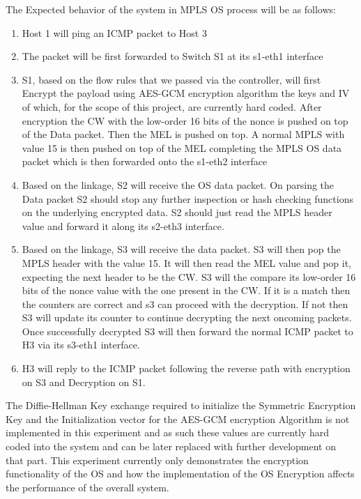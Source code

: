 The Expected behavior of the system in MPLS OS process will be as follows:
\begin{enumerate}
\item Host 1 will ping an ICMP packet to Host 3
\item The packet will be first forwarded to Switch S1 at its s1-eth1 interface
\item S1, based on the flow rules that we passed via the controller, will first Encrypt the payload using AES-GCM encryption algorithm the keys and IV of which, for the scope of this project, are currently hard coded. After encryption the CW with the low-order 16 bits of the nonce is pushed on top of the Data packet. Then the MEL is pushed on top. A normal MPLS with value 15 is then pushed on top of the MEL completing the MPLS OS data packet which is then forwarded onto the s1-eth2 interface
\item Based on the linkage, S2 will receive the OS data packet. On parsing the Data packet S2 should stop any further inspection or hash checking functions on the underlying encrypted data. S2 should just read the MPLS header value and forward it along its s2-eth3 interface.
\item Based on the linkage, S3 will receive the data packet. S3 will then pop the MPLS header with the value 15. It will then read the MEL value and pop it, expecting the next header to be the CW. S3 will the compare its low-order 16 bits of the nonce value with the one present in the CW. If it is a match then the counters are correct and s3 can proceed with the decryption. If not then S3 will update its counter to continue decrypting the next oncoming packets. Once successfully decrypted S3 will then forward the normal ICMP packet to H3 via its s3-eth1 interface.
\item H3 will reply to the ICMP packet following the reverse path with encryption on S3 and Decryption on S1.
\end{enumerate}

The Diffie-Hellman Key exchange required to initialize the Symmetric Encryption Key and the Initialization vector for the AES-GCM encryption Algorithm is not implemented in this experiment and as such these values are currently hard coded into the system and can be later replaced with further development on that part. This experiment currently only demonstrates the encryption functionality of the OS and how the implementation of the OS Encryption affects the performance of the overall system.

